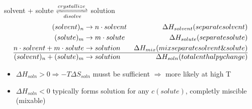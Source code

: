 \documentclass[ wastespaceontitle, english]{cheat_sheet_template}
\begin{document}
     solvent + solute $\xrightleftharpoons[disolve]{crystallize}$ solution
     \begin{align}
        (solvent)_n &\to n \cdot solvent &\Delta H_{solvent} (separate solvent) \\
        (solute)_m &\to m \cdot solute &\Delta H_{solute} (separate solute) \\
        n \cdot solvent +  m \cdot solute   &\to solution &\Delta H_{mix} ( mix separate solvent \& solute) \\ \hline
         (solvent)_n + (solute)_m &\to solution &\Delta H_{soln} (total enthalpy change) \notag
     \end{align}
     \begin{itemize}
         \item $\Delta H_{soln} > 0 \Rightarrow - T \Delta S_{soln}$ musst be sufficient $\Rightarrow$ more likely at high T 
         \item $\Delta H_{soln} < 0$ typically forms solution for any $c(solute)$, completly miscible (mixable)
     \end{itemize}
\end{document}
